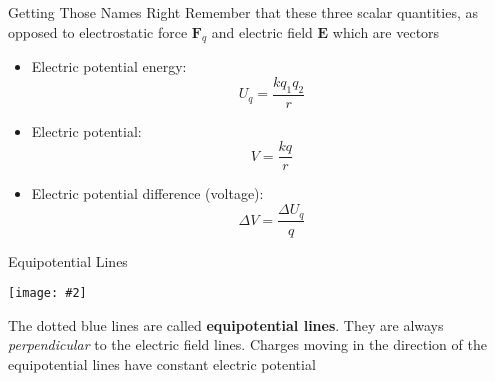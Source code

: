 \documentclass[12pt,aspectratio=169]{beamer}
\newcommand{\pic}[2]{\texttt{[image: \#2]}}
\newcommand{\mb}[1]{\mathbf{#1}}
\newcommand{\eq}[2]{\vspace{#1}{
    \Large\begin{displaymath}#2\end{displaymath}}
}
\begin{document}
\begin{frame}{Getting Those Names Right}
  Remember that these three scalar quantities, as opposed to electrostatic
  force $\mb{F}_q$ and electric field $\mb{E}$ which are vectors
  \begin{itemize}
  \item Electric potential energy:
    \begin{displaymath}
      U_q=\frac{kq_1q_2}r
    \end{displaymath}
  \item Electric potential:
    \begin{displaymath}
      V=\frac{kq}r
    \end{displaymath}
  \item Electric potential difference (voltage):
    \begin{displaymath}
      \Delta V=\frac{\Delta U_q}q
    \end{displaymath}
  \end{itemize}
\end{frame}


%
%    



\begin{frame}{Equipotential Lines}
  \begin{center}
    \pic{0.65}{plate3.png}
  \end{center}
  The dotted blue lines are called \textbf{equipotential lines}. They are
  always \emph{perpendicular} to the electric field lines. Charges moving in
  the direction of the equipotential lines have constant electric potential
\end{frame}
\end{document}
